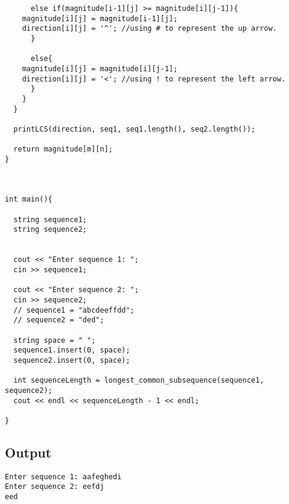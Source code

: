 \documentclass{article}
\begin{document}
\begin{verbatim}
      else if(magnitude[i-1][j] >= magnitude[i][j-1]){
	magnitude[i][j] = magnitude[i-1][j];
	direction[i][j] = '^'; //using # to represent the up arrow.
      }
	  
      else{
	magnitude[i][j] = magnitude[i][j-1];
	direction[i][j] = '<'; //using ! to represent the left arrow.
      }
    }
  }
	
  printLCS(direction, seq1, seq1.length(), seq2.length());
	
  return magnitude[m][n];
}



int main(){
  
  string sequence1;
  string sequence2;


  cout << "Enter sequence 1: ";
  cin >> sequence1;

  cout << "Enter sequence 2: ";
  cin >> sequence2;  
  // sequence1 = "abcdeeffdd";
  // sequence2 = "ded";
  
  string space = " ";
  sequence1.insert(0, space);
  sequence2.insert(0, space);

  int sequenceLength = longest_common_subsequence(sequence1, sequence2);
  cout << endl << sequenceLength - 1 << endl;
  
}
\end{verbatim}

\subsection{Output}

\begin{verbatim}
Enter sequence 1: aafeghedi
Enter sequence 2: eefdj
eed
\end{verbatim}  
\end{document}

